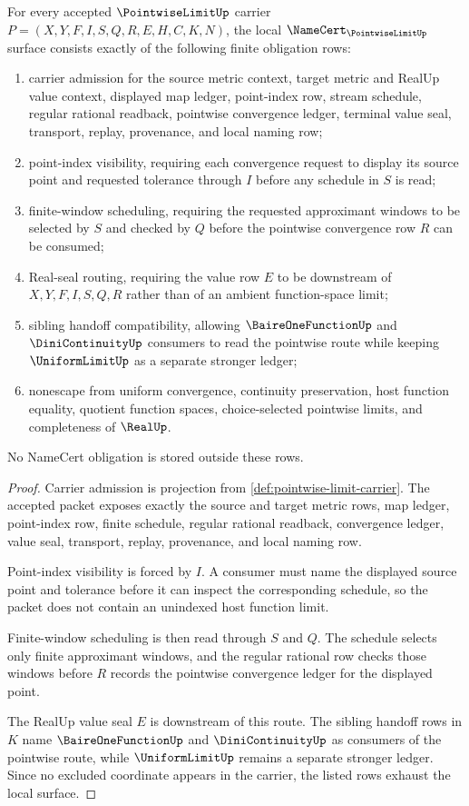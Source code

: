 \begin{theorem}
\label{thm:pointwise-limit-namecert-obligations}
For every accepted $\PointwiseLimitUp$ carrier $P=(X,Y,F,I,S,Q,R,E,H,C,K,N)$, the local $\NameCert_{\PointwiseLimitUp}$ surface consists exactly of the following finite obligation rows:
\begin{enumerate}
\item carrier admission for the source metric context, target metric and RealUp value context, displayed map ledger, point-index row, stream schedule, regular rational readback, pointwise convergence ledger, terminal value seal, transport, replay, provenance, and local naming row;
\item point-index visibility, requiring each convergence request to display its source point and requested tolerance through $I$ before any schedule in $S$ is read;
\item finite-window scheduling, requiring the requested approximant windows to be selected by $S$ and checked by $Q$ before the pointwise convergence row $R$ can be consumed;
\item Real-seal routing, requiring the value row $E$ to be downstream of $X,Y,F,I,S,Q,R$ rather than of an ambient function-space limit;
\item sibling handoff compatibility, allowing $\BaireOneFunctionUp$ and $\DiniContinuityUp$ consumers to read the pointwise route while keeping $\UniformLimitUp$ as a separate stronger ledger;
\item nonescape from uniform convergence, continuity preservation, host function equality, quotient function spaces, choice-selected pointwise limits, and completeness of $\RealUp$.
\end{enumerate}
No NameCert obligation is stored outside these rows.
\end{theorem}
\begin{proof}
Carrier admission is projection from \autoref{def:pointwise-limit-carrier}. The accepted packet exposes exactly the source and target metric rows, map ledger, point-index row, finite schedule, regular rational readback, convergence ledger, value seal, transport, replay, provenance, and local naming row.

Point-index visibility is forced by $I$. A consumer must name the displayed source point and tolerance before it can inspect the corresponding schedule, so the packet does not contain an unindexed host function limit.

Finite-window scheduling is then read through $S$ and $Q$. The schedule selects only finite approximant windows, and the regular rational row checks those windows before $R$ records the pointwise convergence ledger for the displayed point.

The RealUp value seal $E$ is downstream of this route. The sibling handoff rows in $K$ name $\BaireOneFunctionUp$ and $\DiniContinuityUp$ as consumers of the pointwise route, while $\UniformLimitUp$ remains a separate stronger ledger. Since no excluded coordinate appears in the carrier, the listed rows exhaust the local surface.
\end{proof}

